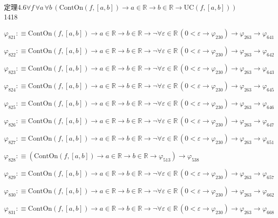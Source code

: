 \begin{fullproof}{定理4.6}{$\forall f\,\forall a\,\forall b\,(\mathrm{ContOn}(f,[a,b]) \to a \in \mathbb{R} \to b \in \mathbb{R} \to \mathrm{UC}(f,[a,b]))$}{1418}
\begin{abbrevlist}
\item $\varphi_{821} :\equiv \mathrm{ContOn}(f,[a,b]) \to a \in \mathbb{R} \to b \in \mathbb{R} \to \neg \forall \varepsilon \in \mathbb{R}\,(0 < \varepsilon \to \varphi_{230}) \to \varphi_{263} \to \varphi_{641}$
\item $\varphi_{822} :\equiv \mathrm{ContOn}(f,[a,b]) \to a \in \mathbb{R} \to b \in \mathbb{R} \to \neg \forall \varepsilon \in \mathbb{R}\,(0 < \varepsilon \to \varphi_{230}) \to \varphi_{263} \to \varphi_{642}$
\item $\varphi_{823} :\equiv \mathrm{ContOn}(f,[a,b]) \to a \in \mathbb{R} \to b \in \mathbb{R} \to \neg \forall \varepsilon \in \mathbb{R}\,(0 < \varepsilon \to \varphi_{230}) \to \varphi_{263} \to \varphi_{643}$
\item $\varphi_{824} :\equiv \mathrm{ContOn}(f,[a,b]) \to a \in \mathbb{R} \to b \in \mathbb{R} \to \neg \forall \varepsilon \in \mathbb{R}\,(0 < \varepsilon \to \varphi_{230}) \to \varphi_{263} \to \varphi_{645}$
\item $\varphi_{825} :\equiv \mathrm{ContOn}(f,[a,b]) \to a \in \mathbb{R} \to b \in \mathbb{R} \to \neg \forall \varepsilon \in \mathbb{R}\,(0 < \varepsilon \to \varphi_{230}) \to \varphi_{263} \to \varphi_{646}$
\item $\varphi_{826} :\equiv \mathrm{ContOn}(f,[a,b]) \to a \in \mathbb{R} \to b \in \mathbb{R} \to \neg \forall \varepsilon \in \mathbb{R}\,(0 < \varepsilon \to \varphi_{230}) \to \varphi_{263} \to \varphi_{647}$
\item $\varphi_{827} :\equiv \mathrm{ContOn}(f,[a,b]) \to a \in \mathbb{R} \to b \in \mathbb{R} \to \neg \forall \varepsilon \in \mathbb{R}\,(0 < \varepsilon \to \varphi_{230}) \to \varphi_{263} \to \varphi_{651}$
\item $\varphi_{828} :\equiv (\mathrm{ContOn}(f,[a,b]) \to a \in \mathbb{R} \to b \in \mathbb{R} \to \varphi_{513}) \to \varphi_{538}$
\item $\varphi_{829} :\equiv \mathrm{ContOn}(f,[a,b]) \to a \in \mathbb{R} \to b \in \mathbb{R} \to \neg \forall \varepsilon \in \mathbb{R}\,(0 < \varepsilon \to \varphi_{230}) \to \varphi_{263} \to \varphi_{657}$
\item $\varphi_{830} :\equiv \mathrm{ContOn}(f,[a,b]) \to a \in \mathbb{R} \to b \in \mathbb{R} \to \neg \forall \varepsilon \in \mathbb{R}\,(0 < \varepsilon \to \varphi_{230}) \to \varphi_{263} \to \varphi_{662}$
\item $\varphi_{831} :\equiv \mathrm{ContOn}(f,[a,b]) \to a \in \mathbb{R} \to b \in \mathbb{R} \to \neg \forall \varepsilon \in \mathbb{R}\,(0 < \varepsilon \to \varphi_{230}) \to \varphi_{263} \to \varphi_{668}$

\end{abbrevlist}
\end{fullproof}

